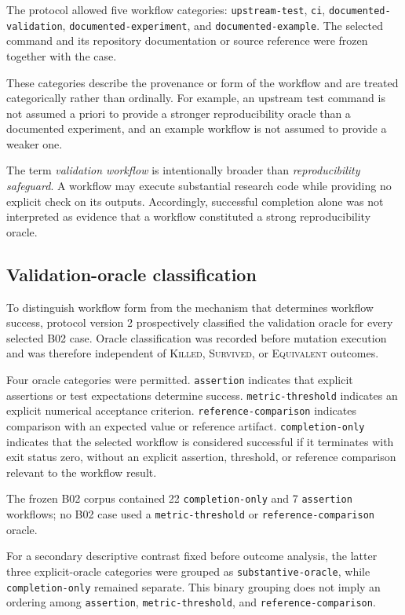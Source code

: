 The protocol allowed five workflow categories:
\texttt{upstream-test}, \texttt{ci},
\texttt{documented-validation}, \texttt{documented-experiment}, and
\texttt{documented-example}. The selected command and its repository
documentation or source reference were frozen together with the case.

These categories describe the provenance or form of the workflow and are
treated categorically rather than ordinally. For example, an upstream test
command is not assumed a priori to provide a stronger reproducibility oracle
than a documented experiment, and an example workflow is not assumed to
provide a weaker one.

The term \emph{validation workflow} is intentionally broader than
\emph{reproducibility safeguard}. A workflow may execute substantial research
code while providing no explicit check on its outputs. Accordingly,
successful completion alone was not interpreted as evidence that a workflow
constituted a strong reproducibility oracle.


\subsection{Validation-oracle classification}
\label{sec:oracle-classification}

To distinguish workflow form from the mechanism that determines workflow
success, protocol version 2 prospectively classified the validation oracle for
every selected B02 case. Oracle classification was recorded before mutation
execution and was therefore independent of \textsc{Killed},
\textsc{Survived}, or \textsc{Equivalent} outcomes.

Four oracle categories were permitted. \texttt{assertion} indicates that
explicit assertions or test expectations determine success.
\texttt{metric-threshold} indicates an explicit numerical acceptance
criterion. \texttt{reference-comparison} indicates comparison with an expected
value or reference artifact. \texttt{completion-only} indicates that the
selected workflow is considered successful if it terminates with exit status
zero, without an explicit assertion, threshold, or reference comparison
relevant to the workflow result.

The frozen B02 corpus contained 22 \texttt{completion-only} and 7
\texttt{assertion} workflows; no B02 case used a
\texttt{metric-threshold} or \texttt{reference-comparison} oracle.

For a secondary descriptive contrast fixed before outcome analysis, the latter
three explicit-oracle categories were grouped as
\texttt{substantive-oracle}, while \texttt{completion-only} remained
separate. This binary grouping does not imply an ordering among
\texttt{assertion}, \texttt{metric-threshold}, and
\texttt{reference-comparison}.

